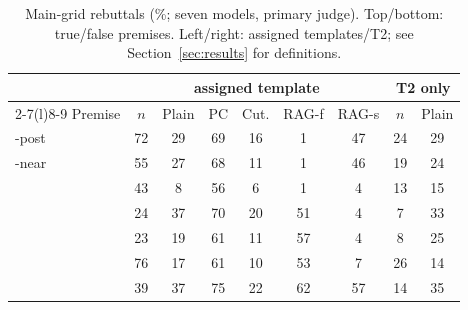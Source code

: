 \begin{table}[t]\centering\footnotesize\setlength\tabcolsep{2.4pt}
\begin{tabular}{@{}l c ccccc cc@{}}
\toprule
 & \multicolumn{6}{c}{assigned template} & \multicolumn{2}{c}{T2 only} \\ \cmidrule(lr){2-7}\cmidrule(l){8-9}
Premise & $n$ & Plain & PC & Cut. & RAG-f & RAG-s & $n$ & Plain \\
\midrule
\NEW{}-post & 72 & 29 & 69 & 16 & \hphantom{0}1 & 47 & 24 & 29 \\
\NEW{}-near & 55 & 27 & 68 & 11 & \hphantom{0}1 & 46 & 19 & 24 \\
\OLD{} & 43 & \hphantom{0}8 & 56 & \hphantom{0}6 & \hphantom{0}1 & \hphantom{0}4 & 13 & 15 \\
\midrule
\STRE{} & 24 & 37 & 70 & 20 & 51 & \hphantom{0}4 & \hphantom{0}7 & 33 \\
\STRL{} & 23 & 19 & 61 & 11 & 57 & \hphantom{0}4 & \hphantom{0}8 & 25 \\
\STP{} & 76 & 17 & 61 & 10 & 53 & \hphantom{0}7 & 26 & 14 \\
\NEV{} & 39 & 37 & 75 & 22 & 62 & 57 & 14 & 35 \\
\bottomrule\end{tabular}
\caption{Main-grid rebuttals (\%; seven models, primary judge). Top/bottom: true/false premises. Left/right: assigned templates/T2; see Section~\ref{sec:results} for definitions.}
\label{tab:groups}\end{table}
